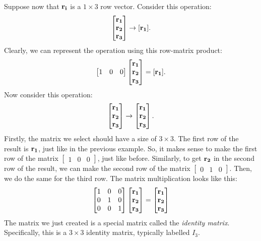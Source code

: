 \documentclass[../main.tex]{subfiles}
\begin{document}
Suppose now that $\mathbf{r_i}$ is a $1\times 3$ row vector. Consider
this operation:
\[\begin{bmatrix}\mathbf{r_1}\\\mathbf{r_2}\\\mathbf{r_3}\end{bmatrix}
	\to[\mathbf{r_1}].\]
Clearly, we can represent the operation using this row-matrix product:
\[\begin{bmatrix}1&0&0\end{bmatrix}\begin{bmatrix}\mathbf{r_1}\\\mathbf{r_2}\\\mathbf{r_3}\end{bmatrix}=[\mathbf{r_1}].\]
Now consider this operation:
\[\begin{bmatrix}\mathbf{r_1}\\\mathbf{r_2}\\\mathbf{r_3}\end{bmatrix}\to\begin{bmatrix}\mathbf{r_1}\\\mathbf{r_2}\\\mathbf{r_3}\end{bmatrix}.\]
Firstly, the matrix we select should have a size of $3\times 3$. The first row of the result
is $\mathbf{r_1}$, just like in the previous example. So, it makes sense to make the first row
of the matrix $\begin{bmatrix}1&0&0\end{bmatrix}$, just like before. Similarly, to get
$\mathbf{r_2}$ in the second row of the result, we can make the second row
of the matrix $\begin{bmatrix}0&1&0\end{bmatrix}$. Then, we do the same for
the third row. The matrix multiplication looks like this:
\[\begin{bmatrix}1&0&0\\0&1&0\\0&0&1\end{bmatrix}\begin{bmatrix}\mathbf{r_1}\\\mathbf{r_2}\\\mathbf{r_3}\end{bmatrix}=\begin{bmatrix}\mathbf{r_1}\\\mathbf{r_2}\\\mathbf{r_3}\end{bmatrix}\]
The matrix we just created is a special matrix called the \textit{identity matrix}. Specifically,
this is a $3\times 3$ identity matrix, typically labelled $I_3$.
\end{document}
